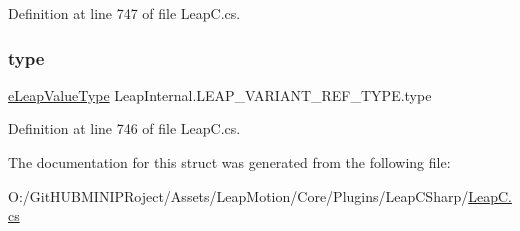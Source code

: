 Definition at line 747 of file Leap\+C.\+cs.

\mbox{\label{struct_leap_internal_1_1_l_e_a_p___v_a_r_i_a_n_t___r_e_f___t_y_p_e_a4abbe7f7993da12ac3755ce4ce9a8acc}} 
\subsubsection{\texorpdfstring{type}{type}}
{\footnotesize\ttfamily \mbox{\hyperlink{namespace_leap_internal_a9c15e305893cd05c1ec6d65cea48737c}{e\+Leap\+Value\+Type}} Leap\+Internal.\+L\+E\+A\+P\+\_\+\+V\+A\+R\+I\+A\+N\+T\+\_\+\+R\+E\+F\+\_\+\+T\+Y\+P\+E.\+type}



Definition at line 746 of file Leap\+C.\+cs.



The documentation for this struct was generated from the following file\+:\begin{DoxyCompactItemize}
\item 
O\+:/\+Git\+H\+U\+B\+M\+I\+N\+I\+P\+Roject/\+Assets/\+Leap\+Motion/\+Core/\+Plugins/\+Leap\+C\+Sharp/\mbox{\hyperlink{_leap_c_8cs}{Leap\+C.\+cs}}\end{DoxyCompactItemize}
